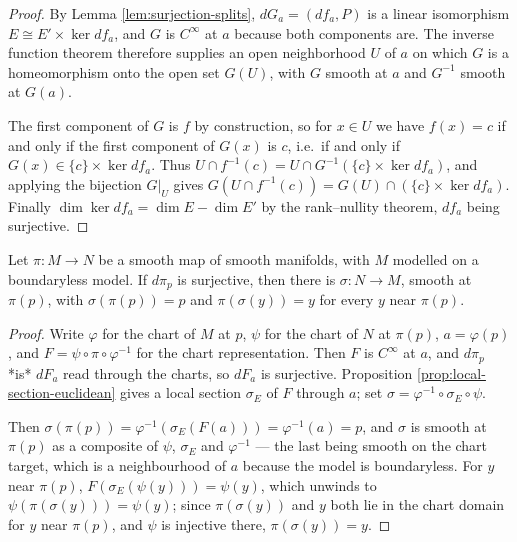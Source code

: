 \begin{proof}

By Lemma \ref{lem:surjection-splits}, $dG_a = (df_a, P)$ is a linear isomorphism $E \cong E' \times \ker df_a$, and $G$ is $C^\infty$ at $a$ because both components are. The inverse function theorem therefore supplies an open neighborhood $U$ of $a$ on which $G$ is a homeomorphism onto the open set $G(U)$, with $G$ smooth at $a$ and $G^{-1}$ smooth at $G(a)$.

The first component of $G$ is $f$ by construction, so for $x \in U$ we have $f(x) = c$ if and only if the first component of $G(x)$ is $c$, i.e.\ if and only if $G(x) \in \{c\} \times \ker df_a$. Thus $U \cap f^{-1}(c) = U \cap G^{-1}(\{c\} \times \ker df_a)$, and applying the bijection $G|_U$ gives $G(U \cap f^{-1}(c)) = G(U) \cap (\{c\} \times \ker df_a)$. Finally $\dim \ker df_a = \dim E - \dim E'$ by the rank–nullity theorem, $df_a$ being surjective.
\end{proof}

\begin{proposition}
\label{prop:local-section-manifold}





Let $\pi : M \to N$ be a smooth map of smooth manifolds, with $M$ modelled on a boundaryless model. If $d\pi_p$ is surjective, then there is $\sigma : N \to M$, smooth at $\pi(p)$, with $\sigma(\pi(p)) = p$ and $\pi(\sigma(y)) = y$ for every $y$ near $\pi(p)$.
\end{proposition}

\begin{proof}

Write $\varphi$ for the chart of $M$ at $p$, $\psi$ for the chart of $N$ at $\pi(p)$, $a = \varphi(p)$, and $F = \psi \circ \pi \circ \varphi^{-1}$ for the chart representation. Then $F$ is $C^\infty$ at $a$, and $d\pi_p$ *is* $dF_a$ read through the charts, so $dF_a$ is surjective. Proposition \ref{prop:local-section-euclidean} gives a local section $\sigma_E$ of $F$ through $a$; set $\sigma = \varphi^{-1} \circ \sigma_E \circ \psi$.

Then $\sigma(\pi(p)) = \varphi^{-1}(\sigma_E(F(a))) = \varphi^{-1}(a) = p$, and $\sigma$ is smooth at $\pi(p)$ as a composite of $\psi$, $\sigma_E$ and $\varphi^{-1}$ — the last being smooth on the chart target, which is a neighbourhood of $a$ because the model is boundaryless. For $y$ near $\pi(p)$, $F(\sigma_E(\psi(y))) = \psi(y)$, which unwinds to $\psi(\pi(\sigma(y))) = \psi(y)$; since $\pi(\sigma(y))$ and $y$ both lie in the chart domain for $y$ near $\pi(p)$, and $\psi$ is injective there, $\pi(\sigma(y)) = y$.
\end{proof}

